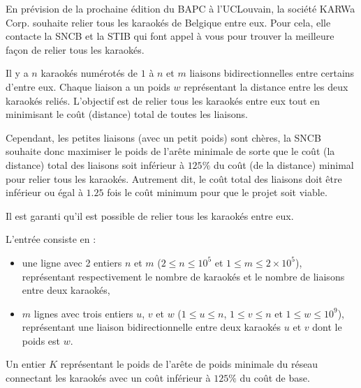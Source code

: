\problemname{\problemyamlname}


En prévision de la prochaine édition du BAPC à l'UCLouvain, la société KARWa Corp. souhaite relier tous les karaokés de Belgique entre eux.
Pour cela, elle contacte la SNCB et la STIB qui font appel à vous pour trouver la meilleure façon de relier tous les karaokés.

Il y a $n$ karaokés numérotés de $1$ à $n$ et $m$ liaisons bidirectionnelles entre certains d'entre eux.
Chaque liaison a un poids $w$ représentant la distance entre les deux karaokés reliés.
L'objectif est de relier tous les karaokés entre eux tout en minimisant le coût (distance) total de toutes les liaisons.

Cependant, les petites liaisons (avec un petit poids) sont chères, la SNCB souhaite donc maximiser le poids de l'arête minimale de sorte que le coût (la distance) total des liaisons soit inférieur à $125\%$ du coût (de la distance) minimal pour relier tous les karaokés.
Autrement dit, le coût total des liaisons doit être inférieur ou égal à $1.25$ fois le coût minimum pour que le projet soit viable.

Il est garanti qu'il est possible de relier tous les karaokés entre eux.

\begin{Input}
	L'entrée consiste en :
	\begin{itemize}
		\item une ligne avec 2 entiers $n$ et $m$ ($2 \le n \le 10^5$ et $1 \le m \le 2 \times 10^5$), représentant respectivement le nombre de karaokés et le nombre de liaisons entre deux karaokés,
		\item $m$ lignes avec trois entiers $u$, $v$ et $w$ ($1 \le u \le n$, $1 \le v \le n$ et $1 \le w \le 10^9$), représentant une liaison bidirectionnelle entre deux karaokés $u$ et $v$ dont le poids est $w$.
	\end{itemize}
\end{Input}

\begin{Output}
	Un entier $K$ représentant le poids de l'arête de poids minimale du réseau connectant les karaokés avec un coût inférieur à $125\%$ du coût de base.
\end{Output}

